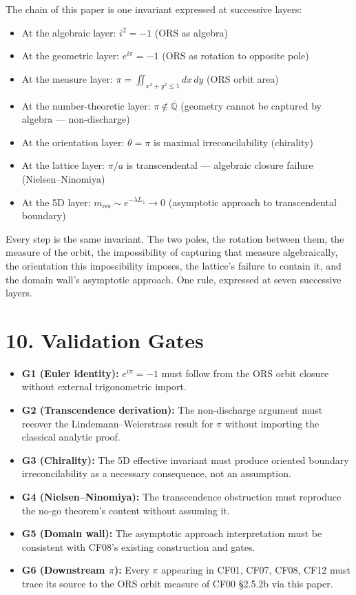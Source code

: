 \documentclass[11pt]{article}
\theoremstyle{definition}
\theoremstyle{remark}
\begin{document}
The chain of this paper is one invariant expressed at successive layers:

\begin{itemize}
\item At the algebraic layer: $i^2=-1$ (ORS as algebra)
\item At the geometric layer: $e^{i\pi}=-1$ (ORS as rotation to opposite pole)
\item At the measure layer: $\pi = \iint_{x^2+y^2\leq 1}dx\,dy$
  (ORS orbit area)
\item At the number-theoretic layer: $\pi\notin\overline{\mathbb{Q}}$
  (geometry cannot be captured by algebra --- non-discharge)
\item At the orientation layer: $\theta=\pi$ is maximal irreconcilability
  (chirality)
\item At the lattice layer: $\pi/a$ is transcendental --- algebraic
  closure failure (Nielsen--Ninomiya)
\item At the 5D layer: $m_\text{res}\sim e^{-\lambda L_5}\to 0$
  (asymptotic approach to transcendental boundary)
\end{itemize}

Every step is the same invariant. The two poles, the rotation between
them, the measure of the orbit, the impossibility of capturing that
measure algebraically, the orientation this impossibility imposes, the
lattice's failure to contain it, and the domain wall's asymptotic
approach. One rule, expressed at seven successive layers.

\section{10. Validation Gates}

\begin{itemize}
\item \textbf{G1 (Euler identity):} $e^{i\pi}=-1$ must follow from the
  ORS orbit closure without external trigonometric import.
\item \textbf{G2 (Transcendence derivation):} The non-discharge argument
  must recover the Lindemann--Weierstrass result for $\pi$ without
  importing the classical analytic proof.
\item \textbf{G3 (Chirality):} The 5D effective invariant must produce
  oriented boundary irreconcilability as a necessary consequence, not an
  assumption.
\item \textbf{G4 (Nielsen--Ninomiya):} The transcendence obstruction
  must reproduce the no-go theorem's content without assuming it.
\item \textbf{G5 (Domain wall):} The asymptotic approach interpretation
  must be consistent with CF08's existing construction and gates.
\item \textbf{G6 (Downstream $\pi$):} Every $\pi$ appearing in CF01,
  CF07, CF08, CF12 must trace its source to the ORS orbit measure of
  CF00 \S 2.5.2b via this paper.
\end{itemize}
\end{document}
